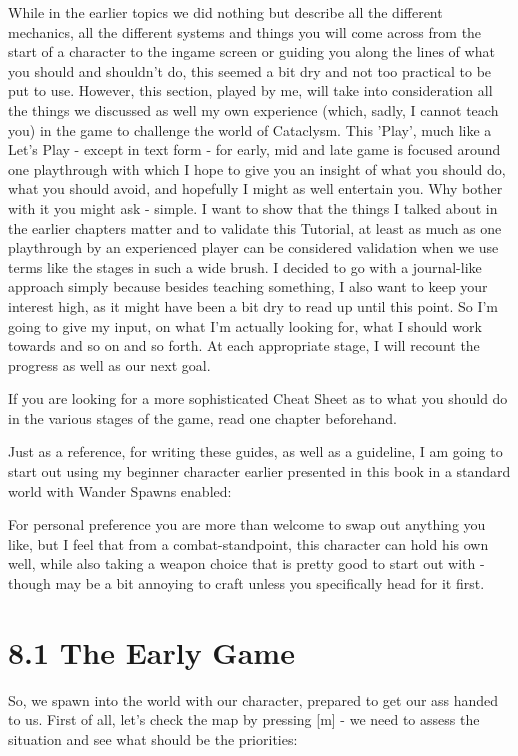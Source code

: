 \documentclass[11pt]{report}
\begin{document}
While in the earlier topics we did nothing but describe all the different mechanics, all the different systems and things you will come across from the start of a character to the ingame screen or guiding you along the lines of what you should and shouldn't do, this seemed a bit dry and not too practical to be put to use. However, this section, played by me, will take into consideration all the things we discussed as well my own experience (which, sadly, I cannot teach you) in the game to challenge the world of Cataclysm. This 'Play', much like a Let's Play - except in text form - for early, mid and late game is focused around one playthrough with which I hope to give you an insight of what you should do, what you should avoid, and hopefully I might as well entertain you. Why bother with it you might ask - simple. I want to show that the things I talked about in the earlier chapters matter and to validate this Tutorial, at least as much as one playthrough by an experienced player can be considered validation when we use terms like the stages in such a wide brush. I decided to go with a journal-like approach simply because besides teaching something, I also want to keep your interest high, as it might have been a bit dry to read up until this point. So I'm going to give my input, on what I'm actually looking for, what I should work towards and so on and so forth. At each appropriate stage, I will recount the progress as well as our next goal.

If you are looking for a more sophisticated Cheat Sheet as to what you should do in the various stages of the game, read one chapter beforehand.

Just as a reference, for writing these guides, as well as a guideline, I am going to start out using my beginner character earlier presented in this book in a standard world with Wander Spawns enabled:



For personal preference you are more than welcome to swap out anything you like, but I feel that from a combat-standpoint, this character can hold his own well, while also taking a weapon choice that is pretty good to start out with - though may be a bit annoying to craft unless you specifically head for it first.


\section{8.1 The Early Game}

So, we spawn into the world with our character, prepared to get our ass handed to us. First of all, let's check the map by pressing [m] - we need to assess the situation and see what should be the priorities:
\end{document}
